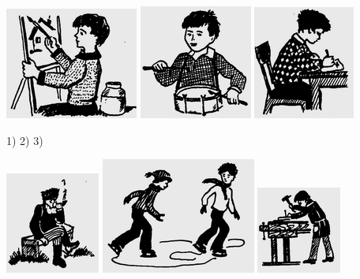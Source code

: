 \documentclass[a5paper]{article}
\begin{document}
 \includegraphics[width=1.7189in,height=1.448in]{MuhammadBagauddinlatinized-img292.png}   \includegraphics[width=1.4583in,height=1.4791in]{MuhammadBagauddinlatinized-img293.png}   \includegraphics[width=1.3126in,height=1.4689in]{MuhammadBagauddinlatinized-img294.png} 

1) 2) 3) 

 \includegraphics[width=1.2189in,height=1.3126in]{MuhammadBagauddinlatinized-img295.png}   \includegraphics[width=2in,height=1.5in]{MuhammadBagauddinlatinized-img296.png}   \includegraphics[width=1.0937in,height=1.1252in]{MuhammadBagauddinlatinized-img297.png} 
\end{document}
